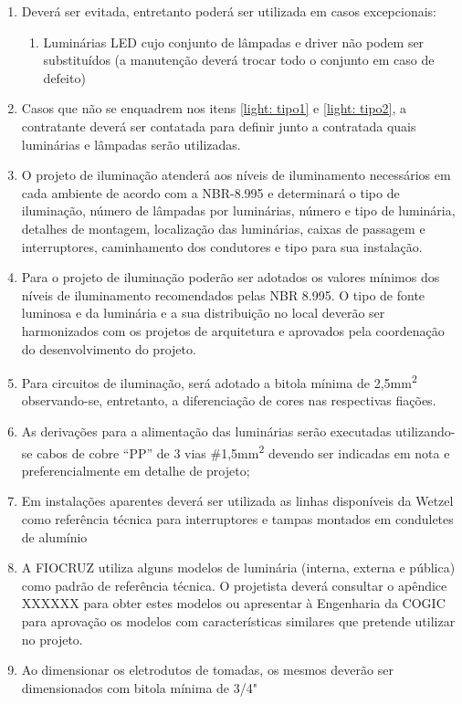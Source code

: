 \begin{enumerate}
	\item Deverá ser evitada, entretanto poderá ser utilizada em casos excepcionais:\label{light: tipo2}
	\begin{enumerate} 
		
		\item Luminárias LED cujo conjunto de lâmpadas e driver não podem ser substituídos (a manutenção deverá trocar todo o conjunto em caso de defeito)		
	\end{enumerate}

	\item Casos que não se enquadrem nos itens \ref{light: tipo1} e \ref{light: tipo2}, a contratante deverá ser contatada para definir junto a contratada quais luminárias e lâmpadas serão utilizadas.

	
	\item O projeto de iluminação atenderá aos níveis de iluminamento necessários em cada ambiente de acordo com a NBR-8.995 e determinará o tipo de iluminação, número de lâmpadas por luminárias, número e tipo de luminária, detalhes de montagem, localização das luminárias, caixas de passagem e interruptores, caminhamento dos condutores e tipo para sua instalação. 
	
	\item Para o projeto de iluminação poderão ser adotados os valores mínimos dos níveis de iluminamento recomendados pelas NBR 8.995. O tipo de fonte luminosa e da luminária e a sua distribuição no local deverão ser harmonizados com os projetos de arquitetura e aprovados pela coordenação do desenvolvimento do projeto.
	
	\item \label{lighting: bitola minima} Para circuitos de iluminação, será adotado a bitola mínima de 2,5mm\textsuperscript{2} observando-se, entretanto, a diferenciação de cores nas respectivas fiações.
	
	\item As derivações para a alimentação das luminárias serão executadas utilizando-se cabos de cobre “PP” de 3 vias \#1,5mm\textsuperscript{2} devendo ser indicadas em nota e preferencialmente em detalhe de projeto;
	
	\item Em instalações aparentes deverá ser utilizada as linhas disponíveis da Wetzel como referência técnica para interruptores e tampas montados em conduletes de alumínio
	
	\item A FIOCRUZ utiliza alguns modelos de luminária (interna, externa e pública) como padrão de referência técnica. O projetista deverá consultar o apêndice XXXXXX para obter estes modelos ou apresentar à Engenharia da COGIC para aprovação os modelos com características similares que pretende utilizar no projeto.
	
	\item Ao dimensionar os eletrodutos de tomadas, os mesmos deverão ser dimensionados com bitola mínima de 3/4"%
\end{enumerate}